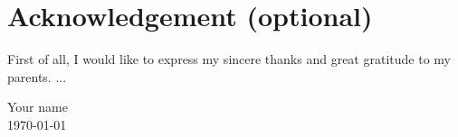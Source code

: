 \chapter*{Acknowledgement (optional)}
\begingroup
\raggedright
{} %
\setlength{\parskip}{0.5\baselineskip}

First of all, I would like to express my sincere thanks and great gratitude to my parents. ...

\begin{flushright}
Your name \\
\mydate\today
\end{flushright}

\endgroup